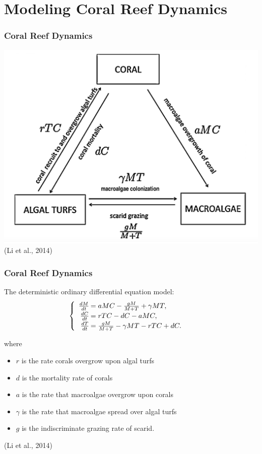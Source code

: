 \section{Modeling Coral Reef Dynamics}

\begin{frame}
\frametitle{Coral Reef Dynamics}
\includegraphics[scale=.175]{./coral-reef-triangle.png}\\(Li et al., 2014)
\end{frame}

\begin{frame}\frametitle{Coral Reef Dynamics}
The deterministic ordinary differential equation model:
$$\begin{cases}\begin{array}{rl}
\frac{dM}{dt}\hspace{-.8em}&=aMC - \frac{gM}{M+T} + \gamma M T, \\
\frac{dC}{dt}\hspace{-.8em}&=rTC - dC - aMC, \\
\frac{dT}{dt}\hspace{-.8em}&=\frac{gM}{M + T} - \gamma MT - rTC + dC. 
\end{array}\end{cases}$$ 

where 
\begin{itemize}\itemsep0pt
\item $r$ is the rate corals overgrow upon algal turfs\\
\item $d$ is the mortality rate of corals\\
\item $a$ is the rate that macroalgae overgrow upon corals\\
\item $\gamma$ is the rate that macroalgae spread over algal turfs\\
\item $g$ is the indiscriminate grazing rate of scarid.
\end{itemize} \vspace{1em}
(Li et al., 2014)
\end{frame}

